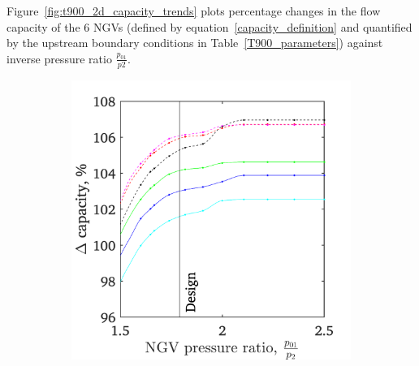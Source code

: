 \documentclass[a4paper, 11pt, oneside]{report}
\begin{document}
Figure~\ref{fig:t900_2d_capacity_trends} plots percentage changes in the flow capacity of the 6 NGVs (defined by equation~\ref{capacity_definition} and quantified by the upstream boundary conditions in Table~\ref{T900_parameters}) against inverse pressure ratio $\frac{p_{01}}{p2}$.

\begin{figure}[H]
	\centering
	\begin{subfigure}{.45\textwidth}
		\centering
		\includegraphics[width=\linewidth]{figs/t900_2d_capacity_trends.png}
	\end{subfigure}
	\begin{subfigure}{.1125\textwidth}
		\centering

\end{subfigure}
\end{figure}
\end{document}
